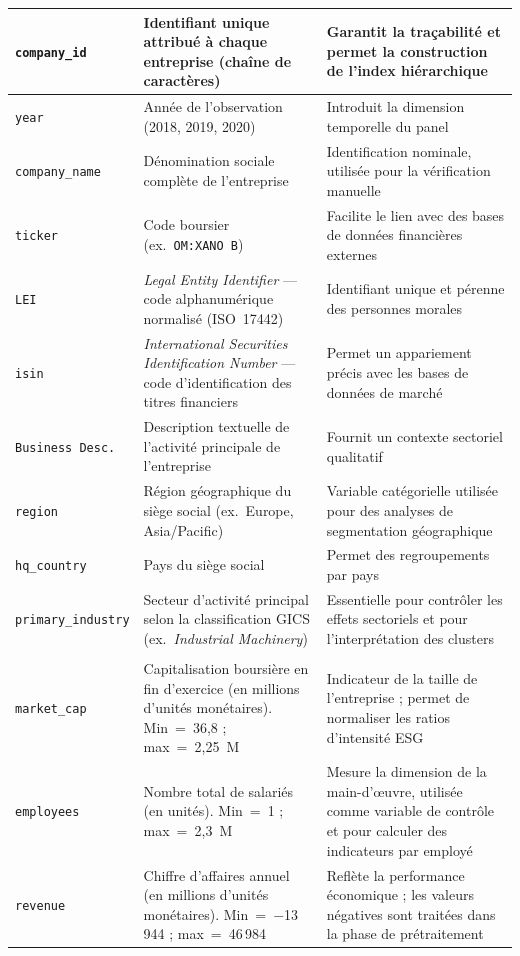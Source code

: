 \begin{longtable}{>{\raggedright\arraybackslash}p{}
                  >{\raggedright\arraybackslash}p{}
                  >{\raggedright\arraybackslash}p{}}
\texttt{company\_id} & Identifiant unique attribué à chaque entreprise (chaîne de caractères) & Garantit la traçabilité et permet la construction de l'index hiérarchique \\
\midrule
\texttt{year} & Année de l'observation (2018, 2019, 2020) & Introduit la dimension temporelle du panel \\
\midrule
\texttt{company\_name} & Dénomination sociale complète de l'entreprise & Identification nominale, utilisée pour la vérification manuelle \\
\midrule
\texttt{ticker} & Code boursier (ex.\ \texttt{OM:XANO B}) & Facilite le lien avec des bases de données financières externes \\
\midrule
\texttt{LEI} & \textit{Legal Entity Identifier} — code alphanumérique normalisé (ISO~17442) & Identifiant unique et pérenne des personnes morales \\
\midrule
\texttt{isin} & \textit{International Securities Identification Number} — code d'identification des titres financiers & Permet un appariement précis avec les bases de données de marché \\
\midrule
\texttt{Business Desc.} & Description textuelle de l'activité principale de l'entreprise & Fournit un contexte sectoriel qualitatif \\
\midrule
\texttt{region} & Région géographique du siège social (ex.\ Europe, Asia/Pacific) & Variable catégorielle utilisée pour des analyses de segmentation géographique \\
\midrule
\texttt{hq\_country} & Pays du siège social & Permet des regroupements par pays \\
\midrule
\texttt{primary\_industry} & Secteur d'activité principal selon la classification GICS (ex.\ \textit{Industrial Machinery}) & Essentielle pour contrôler les effets sectoriels et pour l'interprétation des clusters \\

\midrule

\multicolumn{3}{l}{\textbf{Variables financières}} \\
\midrule

\texttt{market\_cap} & Capitalisation boursière en fin d'exercice (en millions d'unités monétaires). Min~=~36,8 ; max~=~2,25~M & Indicateur de la taille de l'entreprise ; permet de normaliser les ratios d'intensité ESG \\
\midrule
\texttt{employees} & Nombre total de salariés (en unités). Min~=~1 ; max~=~2,3~M & Mesure la dimension de la main-d'\oe uvre, utilisée comme variable de contrôle et pour calculer des indicateurs par employé \\
\midrule
\texttt{revenue} & Chiffre d'affaires annuel (en millions d'unités monétaires). Min~=~$-$13\,944 ; max~=~46\,984 & Reflète la performance économique ; les valeurs négatives sont traitées dans la phase de prétraitement \\


\end{longtable}
